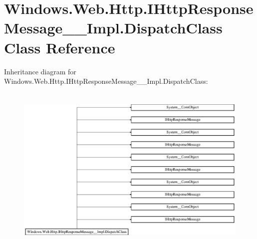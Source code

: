\hypertarget{class_windows_1_1_web_1_1_http_1_1_i_http_response_message_____impl_1_1_dispatch_class}{}\section{Windows.\+Web.\+Http.\+I\+Http\+Response\+Message\+\_\+\+\_\+\+Impl.\+Dispatch\+Class Class Reference}
\label{class_windows_1_1_web_1_1_http_1_1_i_http_response_message_____impl_1_1_dispatch_class}
Inheritance diagram for Windows.\+Web.\+Http.\+I\+Http\+Response\+Message\+\_\+\+\_\+\+Impl.\+Dispatch\+Class\+:\begin{figure}[H]
\begin{center}
\leavevmode
\includegraphics[height=8.105263cm]{class_windows_1_1_web_1_1_http_1_1_i_http_response_message_____impl_1_1_dispatch_class}
\end{center}
\end{figure}
